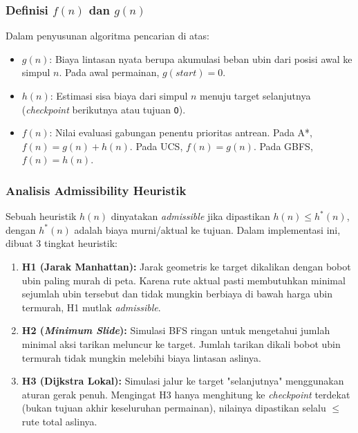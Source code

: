 \documentclass[11pt,a4paper]{article}
\begin{document}
\subsubsection{Definisi $f(n)$ dan $g(n)$}
Dalam penyusunan algoritma pencarian di atas:
\begin{itemize}[noitemsep]
    \item $g(n)$: Biaya lintasan nyata berupa akumulasi beban ubin dari posisi awal ke simpul $n$. Pada awal permainan, $g(start) = 0$.
    \item $h(n)$: Estimasi sisa biaya dari simpul $n$ menuju target selanjutnya (\textit{checkpoint} berikutnya atau tujuan \texttt{O}).
    \item $f(n)$: Nilai evaluasi gabungan penentu prioritas antrean. Pada A*, $f(n) = g(n) + h(n)$. Pada UCS, $f(n) = g(n)$. Pada GBFS, $f(n) = h(n)$.
\end{itemize}

\subsubsection{Analisis Admissibility Heuristik}
Sebuah heuristik $h(n)$ dinyatakan \textit{admissible} jika dipastikan $h(n) \leq h^*(n)$, dengan $h^*(n)$ adalah biaya murni/aktual ke tujuan.
Dalam implementasi ini, dibuat 3 tingkat heuristik:
\begin{enumerate}[noitemsep]
    \item \textbf{H1 (Jarak Manhattan):} Jarak geometris ke target dikalikan dengan bobot ubin paling murah di peta. Karena rute aktual pasti membutuhkan minimal sejumlah ubin tersebut dan tidak mungkin berbiaya di bawah harga ubin termurah, H1 mutlak \textit{admissible}.
    \item \textbf{H2 (\textit{Minimum Slide}):} Simulasi BFS ringan untuk mengetahui jumlah minimal aksi tarikan meluncur ke target. Jumlah tarikan dikali bobot ubin termurah tidak mungkin melebihi biaya lintasan aslinya.
    \item \textbf{H3 (Dijkstra Lokal):} Simulasi jalur ke target "selanjutnya" menggunakan aturan gerak penuh. Mengingat H3 hanya menghitung ke \textit{checkpoint} terdekat (bukan tujuan akhir keseluruhan permainan), nilainya dipastikan selalu $\leq$ rute total aslinya.
\end{enumerate}
\end{document}

